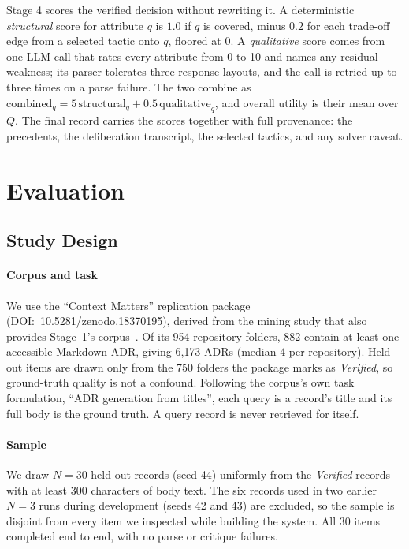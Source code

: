 \documentclass[preprint,12pt,authoryear]{elsarticle}
\renewcommand{\_}{\textunderscore\allowbreak{}}
\begin{document}
Stage 4 scores the verified decision without rewriting it. A deterministic \emph{structural} score for attribute $q$ is $1.0$ if $q$ is covered, minus $0.2$ for each trade-off edge from a selected tactic onto $q$, floored at $0$. A \emph{qualitative} score comes from one LLM call that rates every attribute from 0 to 10 and names any residual weakness; its parser tolerates three response layouts, and the call is retried up to three times on a parse failure. The two combine as $\mathrm{combined}_q = 5\,\mathrm{structural}_q + 0.5\,\mathrm{qualitative}_q$, and overall utility is their mean over $Q$. The final record carries the scores together with full provenance: the precedents, the deliberation transcript, the selected tactics, and any solver caveat.

\section{Evaluation}
\label{sec:evaluation}

\subsection{Study Design}
\label{sec:eval-design}

\paragraph{Corpus and task} We use the ``Context Matters'' replication package~\citep{contextmatters-zenodo} (DOI:~10.5281/zenodo.18370195), derived from the mining study that also provides Stage~1's corpus~\citep{buchgeher2023adr}. Of its 954 repository folders, 882 contain at least one accessible Markdown ADR, giving 6{,}173 ADRs (median 4 per repository). Held-out items are drawn only from the 750 folders the package marks as \textit{Verified}, so ground-truth quality is not a confound. Following the corpus's own task formulation, ``ADR generation from titles'', each query is a record's title and its full body is the ground truth. A query record is never retrieved for itself.

\paragraph{Sample} We draw $N=30$ held-out records (seed 44) uniformly from the \textit{Verified} records with at least 300 characters of body text. The six records used in two earlier $N=3$ runs during development (seeds 42 and 43) are excluded, so the sample is disjoint from every item we inspected while building the system. All 30 items completed end to end, with no parse or critique failures.
\end{document}
